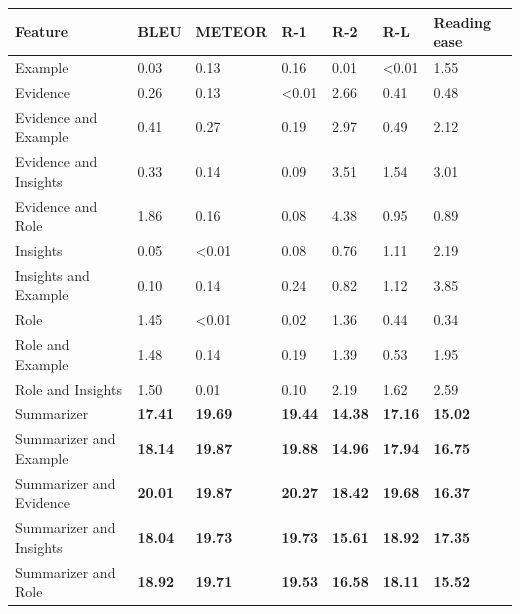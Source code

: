 \begin{tabular}{|l|l|l|l|l|l|l|}
\hline
\textbf{Feature} & BLEU & METEOR & R-1 & R-2 & R-L & Reading ease \\
 \hline
 Example & 0.03 & 0.13 & 0.16 & 0.01 & \textless{}0.01 & 1.55 \\
 \hline
 Evidence & 0.26 & 0.13 & \textless{}0.01 & 2.66 & 0.41 & 0.48 \\
 \hline
 Evidence and Example & 0.41 & 0.27 & 0.19 & 2.97 & 0.49 & 2.12 \\
 \hline
 Evidence and Insights & 0.33 & 0.14 & 0.09 & 3.51 & 1.54 & 3.01 \\
 \hline
 Evidence and Role & 1.86 & 0.16 & 0.08 & 4.38 & 0.95 & 0.89 \\
 \hline
 Insights & 0.05 & \textless{}0.01 & 0.08 & 0.76 & 1.11 & 2.19 \\
 \hline
 Insights and Example & 0.10 & 0.14 & 0.24 & 0.82 & 1.12 & 3.85 \\
 \hline
 Role & 1.45 & \textless{}0.01 & 0.02 & 1.36 & 0.44 & 0.34 \\
 \hline
 Role and Example & 1.48 & 0.14 & 0.19 & 1.39 & 0.53 & 1.95 \\
 \hline
 Role and Insights & 1.50 & 0.01 & 0.10 & 2.19 & 1.62 & 2.59 \\
 \hline
 Summarizer & \textbf{17.41} & \textbf{19.69} & \textbf{19.44} & \textbf{14.38} & \textbf{17.16} & \textbf{15.02} \\
 \hline
 Summarizer and Example & \textbf{18.14} & \textbf{19.87} & \textbf{19.88} & \textbf{14.96} & \textbf{17.94} & \textbf{16.75} \\
 \hline
 Summarizer and Evidence & \textbf{20.01} & \textbf{19.87} & \textbf{20.27} & \textbf{18.42} & \textbf{19.68} & \textbf{16.37} \\
 \hline
 Summarizer and Insights & \textbf{18.04} & \textbf{19.73} & \textbf{19.73} & \textbf{15.61} & \textbf{18.92} & \textbf{17.35} \\
 \hline
 Summarizer and Role & \textbf{18.92} & \textbf{19.71} & \textbf{19.53} & \textbf{16.58} & \textbf{18.11} & \textbf{15.52} \\
\hline
\end{tabular}
